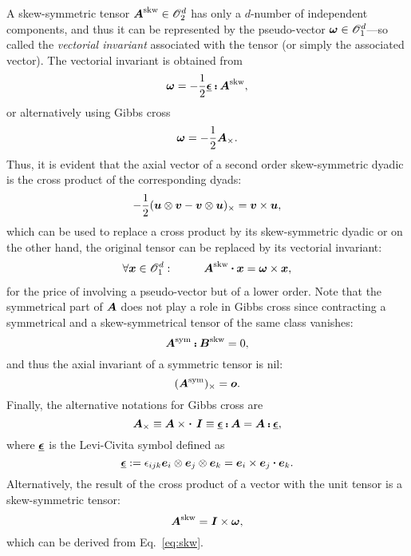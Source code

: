 	A skew-symmetric tensor $\tenb{A}^\skw\in\class{2}{d}$ has only a $d$-number of independent components, and thus it can be represented by the pseudo-vector $\tena{\omega}\in\class{1}{d}$---so called the \textit{vectorial invariant} associated with the tensor (or simply the associated vector). The vectorial invariant is obtained from
\begin{equation}
\tena{\omega}=-\frac{1}{2}\levi\dscp\tenb{A}^\skw,\label{eq:skw}
\end{equation}
or alternatively using Gibbs cross~\autocite{Lurie.1990}
\begin{equation}
\tena{\omega}=-\frac{1}{2}\gibbs{\tenb{A}}.
\end{equation}
Thus, it is evident that the axial vector of a second order skew-symmetric dyadic is the cross product of the corresponding dyads: 
\begin{equation}
-\frac{1}{2}\gibbs{(\tena{u}\dyad\tena{v}-\tena{v}\dyad\tena{u})}=\tena{v}\cross\tena{u},
\end{equation}
which can be used to replace a cross product by its skew-symmetric dyadic or on the other hand, the original tensor can be replaced by its vectorial invariant:
\begin{alignat}{2}
&\forall \tena{x}\in\class{1}{d}:&\qquad\tenb{A}^\skw\scp\tena{x}=\tena{\omega}\times \tena{x},
\end{alignat}
for the price of involving a pseudo-vector but of a lower order. Note that the symmetrical part of $\tenb{A}$ does not play a role in Gibbs cross since contracting a symmetrical and a skew-symmetrical tensor of the same class vanishes:
\begin{equation}
\tenb{A}^\sym\dscp\tenb{B}^\skw=0,
\end{equation}
and thus the axial invariant of a symmetric tensor is nil:
\begin{equation}
\gibbs{(\tenb{A}^\sym)}=\nulla.
\end{equation}
Finally, the alternative notations for Gibbs cross are \autocite{Assmus.2017b}
\begin{equation}
\gibbs{\tenb{A}}\equiv \tenb{A}\times\scp\,\unitb\equiv\levi\dscp\tenb{A}=\tenb{A}\dscp\levi, %
\end{equation}
where $\levi$ is the Levi-Civita symbol defined as
\begin{equation}
\levi\equidef\epsilon_{ijk}\base_i\dyad\base_j\dyad\base_k=\base_i\cross\base_j\scp\base_k.%
\end{equation}
	Alternatively, the result of the cross product of a vector with the unit tensor is a skew-symmetric tensor:
	\begin{equation}
		\tenb{A}^\skw = \unitb\cross\tena{\omega},
	\end{equation}
	which can be derived from Eq.~\eqref{eq:skw}.\bl



